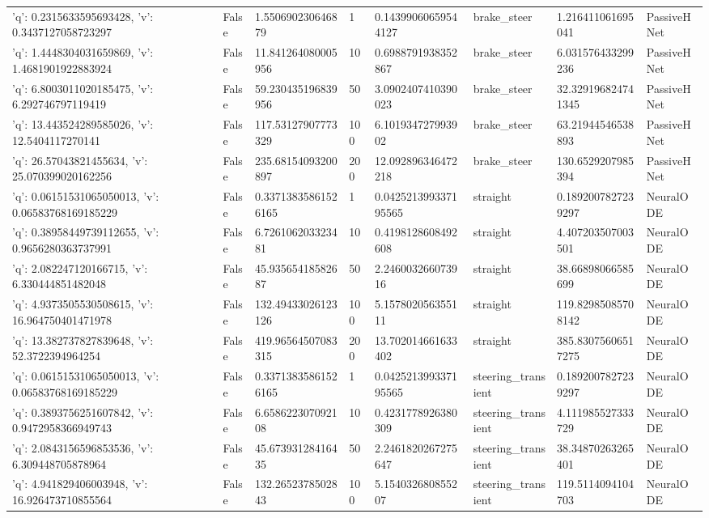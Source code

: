\begin{tabular}{llllllll}
{'q': 0.2315633595693428, 'v': 0.3437127058723297} & False & 1.550690230646879 & 1 & 0.14399060659544127 & brake\_steer & 1.216411061695041 & PassiveHNet \\
{'q': 1.4448304031659869, 'v': 1.4681901922883924} & False & 11.841264080005956 & 10 & 0.6988791938352867 & brake\_steer & 6.031576433299236 & PassiveHNet \\
{'q': 6.8003011020185475, 'v': 6.292746797119419} & False & 59.230435196839956 & 50 & 3.0902407410390023 & brake\_steer & 32.329196824741345 & PassiveHNet \\
{'q': 13.443524289585026, 'v': 12.5404117270141} & False & 117.53127907773329 & 100 & 6.101934727993902 & brake\_steer & 63.21944546538893 & PassiveHNet \\
{'q': 26.57043821455634, 'v': 25.070399020162256} & False & 235.68154093200897 & 200 & 12.092896346472218 & brake\_steer & 130.6529207985394 & PassiveHNet \\
{'q': 0.06151531065050013, 'v': 0.06583768169185229} & False & 0.33713835861526165 & 1 & 0.042521399337195565 & straight & 0.1892007827239297 & NeuralODE \\
{'q': 0.38958449739112655, 'v': 0.9656280363737991} & False & 6.726106203323481 & 10 & 0.4198128608492608 & straight & 4.407203507003501 & NeuralODE \\
{'q': 2.082247120166715, 'v': 6.330444851482048} & False & 45.93565418582687 & 50 & 2.246003266073916 & straight & 38.66898066585699 & NeuralODE \\
{'q': 4.9373505530508615, 'v': 16.964750401471978} & False & 132.49433026123126 & 100 & 5.157802056355111 & straight & 119.82985085708142 & NeuralODE \\
{'q': 13.382737827839648, 'v': 52.3722394964254} & False & 419.96564507083315 & 200 & 13.702014661633402 & straight & 385.83075606517275 & NeuralODE \\
{'q': 0.06151531065050013, 'v': 0.06583768169185229} & False & 0.33713835861526165 & 1 & 0.042521399337195565 & steering\_transient & 0.1892007827239297 & NeuralODE \\
{'q': 0.3893756251607842, 'v': 0.9472958366949743} & False & 6.658622307092108 & 10 & 0.4231778926380309 & steering\_transient & 4.111985527333729 & NeuralODE \\
{'q': 2.0843156596853536, 'v': 6.309448705878964} & False & 45.67393128416435 & 50 & 2.2461820267275647 & steering\_transient & 38.34870263265401 & NeuralODE \\
{'q': 4.941829406003948, 'v': 16.926473710855564} & False & 132.2652378502843 & 100 & 5.154032680855207 & steering\_transient & 119.5114094104703 & NeuralODE \\

\end{tabular}
